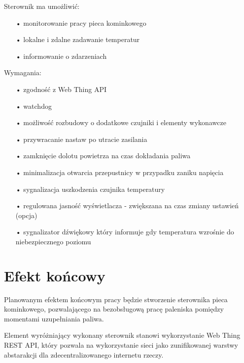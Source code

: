 \documentclass[12pt]{report}
\begin{document}
 Sterownik ma umożliwić:
 \begin{enumerate}
 \item[•] monitorowanie pracy pieca kominkowego
 \item[•] lokalne i zdalne zadawanie temperatur
 \item[•] informowanie o zdarzeniach
 \end{enumerate}
 
 Wymagania:
 \begin{enumerate}
 \item[•] zgodność z Web Thing API
 \item[•] watchdog
 \item[•] możliwość rozbudowy o dodatkowe czujniki i elementy wykonawcze
 \item[•] przywracanie nastaw po utracie zasilania
 \item[•] zamknięcie dolotu powietrza na czas dokładania paliwa
 \item[•] minimalizacja otwarcia przepustnicy w przypadku zaniku napięcia
 \item[•] sygnalizacja uszkodzenia czujnika temperatury
 \item[•] regulowana jasność wyświetlacza - zwiększana na czas zmiany ustawień (opcja)
 \item[•] sygnalizator dźwiękowy który informuje gdy temperatura wzrośnie do niebezpiecznego poziomu
 \end{enumerate}
 
  
 
 \section{Efekt końcowy}
 Planowanym efektem końcowym pracy będzie stworzenie sterownika pieca kominkowego, pozwalającego na bezobsługową pracę paleniska pomiędzy momentami uzupełniania paliwa.

 Element wyróżniający wykonany sterownik stanowi wykorzystanie Web Thing REST API, który pozwala na wykorzystanie sieci jako zunifikowanej warstwy abstarakcji dla zdecentralizowanego internetu rzeczy.
 
\end{document}
